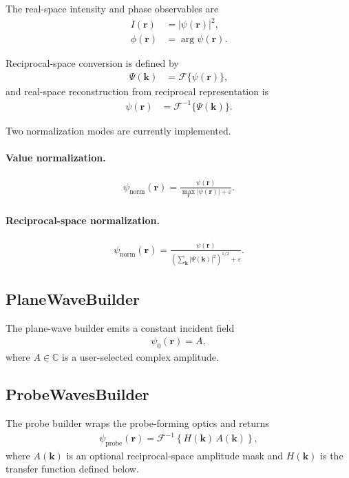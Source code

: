 \documentclass[11pt]{article}
\begin{document}
The real-space intensity and phase observables are
\begin{align}
  I(\mathbf{r}) &= |\psi(\mathbf{r})|^2, \\
  \phi(\mathbf{r}) &= \arg \psi(\mathbf{r}).
\end{align}

Reciprocal-space conversion is defined by
\begin{align}
  \Psi(\mathbf{k}) &= \mathcal{F}\{\psi(\mathbf{r})\},
\end{align}
and real-space reconstruction from reciprocal representation is
\begin{align}
  \psi(\mathbf{r}) &= \mathcal{F}^{-1}\{\Psi(\mathbf{k})\}.
\end{align}

Two normalization modes are currently implemented.

\paragraph{Value normalization.}
\begin{align}
  \psi_{\mathrm{norm}}(\mathbf{r})
  = \frac{\psi(\mathbf{r})}
         {\max_{\mathbf{r}} |\psi(\mathbf{r})| + \varepsilon}.
\end{align}

\paragraph{Reciprocal-space normalization.}
\begin{align}
  \psi_{\mathrm{norm}}(\mathbf{r})
  = \frac{\psi(\mathbf{r})}
         {\left(\sum_{\mathbf{k}} |\Psi(\mathbf{k})|^2\right)^{1/2} + \varepsilon}.
\end{align}

\subsection{PlaneWaveBuilder}
The plane-wave builder emits a constant incident field
\begin{align}
  \psi_0(\mathbf{r}) = A,
\end{align}
where $A \in \mathbb{C}$ is a user-selected complex amplitude.

\subsection{ProbeWavesBuilder}
The probe builder wraps the probe-forming optics and returns
\begin{align}
  \psi_{\mathrm{probe}}(\mathbf{r})
  = \mathcal{F}^{-1}\left\{ H(\mathbf{k}) \, A(\mathbf{k}) \right\},
\end{align}
where $A(\mathbf{k})$ is an optional reciprocal-space amplitude mask and
$H(\mathbf{k})$ is the transfer function defined below.
\end{document}
